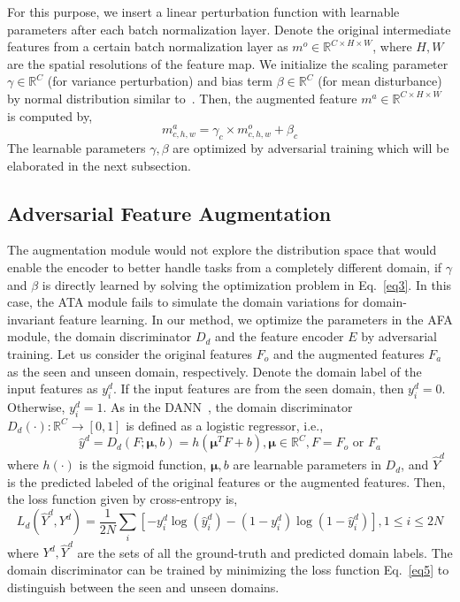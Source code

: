 \documentclass[runningheads]{utils/llncs}
\begin{document}
For this purpose, we insert a linear perturbation function with learnable parameters after each batch normalization layer.
Denote the original intermediate features from a certain batch normalization layer as ${m}^{o}\in\mathbb{R} ^ {C \times H \times W}$, where $H, W$ are the spatial resolutions of the feature map.
We initialize the scaling parameter $\gamma \in \mathbb{R}^{C}$ (for variance perturbation) and bias term $\beta\in \mathbb{R}^{C}$ (for mean disturbance) by normal distribution similar to~\cite{TsengLH020}. 
Then, the augmented feature ${m}^{a} \in\mathbb{R} ^ {C \times H \times W}$ is computed by, 
\begin{equation}
\label{eq9}
{m}^{a}_{c,h,w} = \gamma_{c} \times {m}^{o}_{c,h,w} + \beta_{c}
\end{equation}
The learnable parameters $\gamma, \beta$ are optimized by adversarial training which will be elaborated in the next subsection.




\subsection{Adversarial Feature Augmentation}
The augmentation module would not explore the distribution space that would enable the encoder to better handle tasks from a completely different domain, if $\gamma$ and $\beta$ is directly learned by solving the optimization problem in Eq.~\eqref{eq3}.
In this case, the ATA module fails to simulate the domain variations for domain-invariant feature learning.
In our method, we optimize the parameters in the AFA module, the domain discriminator $D_d$ and the feature encoder $E$ by adversarial training.
Let us consider the original features $F_o$ and the augmented features $F_a$ as the seen and unseen domain, respectively.
Denote the domain label of the input features as ${y}^{d}_{i}$.
If the input features are from the seen domain, then ${y}^{d}_{i} = 0$. Otherwise, ${y}^{d}_{i} = 1$. 
As in the DANN~\cite{GaninUAGLLML17}, the domain discriminator $D_d(\cdot): \mathbb{R} ^ {C} \rightarrow [0, 1]$ is defined as a logistic regressor, i.e.,
\begin{equation}
\label{eq4}
\hat{y}^{d}={D}_{d}(F;\boldsymbol{\mu}, b) = h({\boldsymbol{\mu}}^{T}F + b), \boldsymbol{\mu} \in \mathbb{R} ^ {C}, F = F_o \text{ or } F_a
\end{equation}
where $h(\cdot)$ is the sigmoid function, $\boldsymbol{\mu}, b$ are learnable parameters in $D_d$, and $\hat{Y}^{d}$ is the predicted labeled of the original features or the augmented features. 
Then, the loss function given by cross-entropy is,
\begin{equation}
\label{eq5}
{L}_{d}(\hat{Y}^{d},{Y}^{d}) = \frac{1}{2N}\sum_i[-{y}^{d}_{i}\log({\hat{y}^{d}_{i}}) - (1-{y}^{d}_{i})\log(1 - \hat{y}^{d}_{i})], 1 \leq i \leq 2N
\end{equation}
where ${Y}^{d}, \hat{Y}^{d}$ are the sets of all the ground-truth and predicted domain labels.
The domain discriminator can be trained by minimizing the loss function Eq.~\eqref{eq5} to distinguish between the seen and unseen domains.
\end{document}
